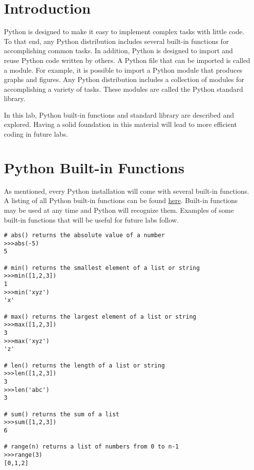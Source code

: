 \label{lab:Standard Library}

\section*{Introduction}

Python is designed to make it easy to implement complex tasks with little code.
To that end, any Python distribution includes several built-in functions for accomplishing common tasks.
In addition, Python is designed to import and reuse Python code written by others.
A Python file that can be imported is called a module.
For example, it is possible to import a Python module that produces graphs and figures.
Any Python distribution includes a collection of modules for accomplishing a variety of tasks.
These modules are called the Python standard library.

In this lab, Python built-in functions and standard library are described and explored.
Having a solid foundation in this material will lead to more efficient coding in future labs.

\section*{Python Built-in Functions}

As mentioned, every Python installation will come with several built-in functions.
A listing of all Python built-in functions can be found \href{https://docs.python.org/2/library/functions.html}{here}.
Built-in functions may be used at any time and Python will recognize them.
Examples of some built-in functions that will be useful for future labs follow.

\begin{lstlisting}
# abs() returns the absolute value of a number
>>>abs(-5)
5

# min() returns the smallest element of a list or string
>>>min([1,2,3])
1
>>>min('xyz')
'x'

# max() returns the largest element of a list or string
>>>max([1,2,3])
3
>>>max('xyz')
'z'

# len() returns the length of a list or string
>>>len([1,2,3])
3
>>>len('abc')
3

# sum() returns the sum of a list
>>>sum([1,2,3])
6

# range(n) returns a list of numbers from 0 to n-1
>>>range(3)
[0,1,2]
\end{lstlisting}

